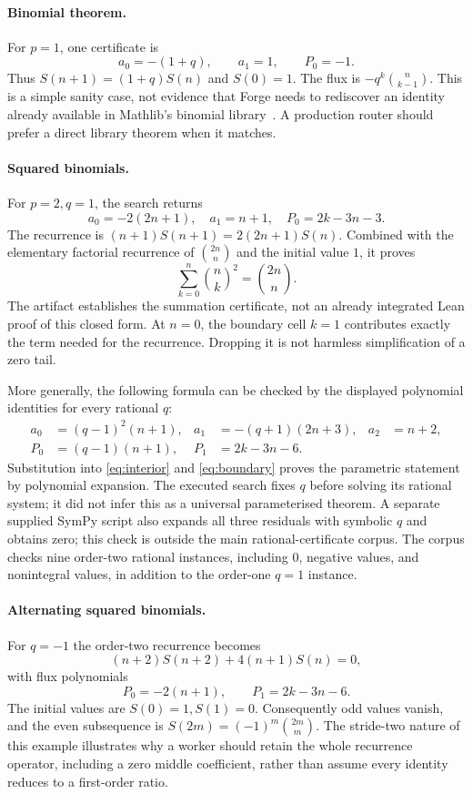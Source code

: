 \paragraph{Binomial theorem.}
For $p=1$, one certificate is
\[
a_0=-(1+q),\qquad a_1=1,\qquad P_0=-1.
\]
Thus $S(n+1)=(1+q)S(n)$ and $S(0)=1$. The flux is
$-q^k\binom n{k-1}$. This is a simple sanity case, not evidence that Forge
needs to rediscover an identity already available in Mathlib's binomial
library~\cite{mathlib-choose}. A production router should prefer a direct
library theorem when it matches.

\paragraph{Squared binomials.}
For $p=2,q=1$, the search returns
\begin{equation}\label{eq:squarecert}
a_0=-2(2n+1),\quad a_1=n+1,\quad P_0=2k-3n-3.
\end{equation}
The recurrence is
$(n+1)S(n+1)=2(2n+1)S(n)$. Combined with the elementary factorial recurrence
of $\binom{2n}n$ and the initial value $1$, it proves
\[
\sum_{k=0}^{n}\binom nk^2=\binom{2n}n.
\]
The artifact establishes the summation certificate, not an already integrated
Lean proof of this closed form. At $n=0$, the boundary cell $k=1$ contributes
exactly the term needed for the recurrence. Dropping it is not harmless
simplification of a zero tail.

More generally, the following formula can be checked by the displayed
polynomial identities for every rational $q$:
\begin{align*}
a_0&=(q-1)^2(n+1),&a_1&=-(q+1)(2n+3),&a_2&=n+2,\\
P_0&=(q-1)(n+1),&P_1&=2k-3n-6.
\end{align*}
Substitution into \eqref{eq:interior} and \eqref{eq:boundary} proves the
parametric statement by polynomial expansion. The executed search fixes $q$
before solving its rational system; it did not infer this as a universal
parameterised theorem. A separate supplied SymPy script also expands all three
residuals with symbolic $q$ and obtains zero; this check is outside the main
rational-certificate corpus. The corpus checks nine order-two rational instances,
including $0$, negative values, and nonintegral values, in addition to the
order-one $q=1$ instance.

\paragraph{Alternating squared binomials.}
For $q=-1$ the order-two recurrence becomes
\[
(n+2)S(n+2)+4(n+1)S(n)=0,
\]
with flux polynomials
\[
P_0=-2(n+1),\qquad P_1=2k-3n-6.
\]
The initial values are $S(0)=1,S(1)=0$. Consequently odd values vanish, and the
even subsequence is $S(2m)=(-1)^m\binom{2m}m$. The stride-two nature of this
example illustrates why a worker should retain the whole recurrence operator,
including a zero middle coefficient, rather than assume every identity reduces
to a first-order ratio.

